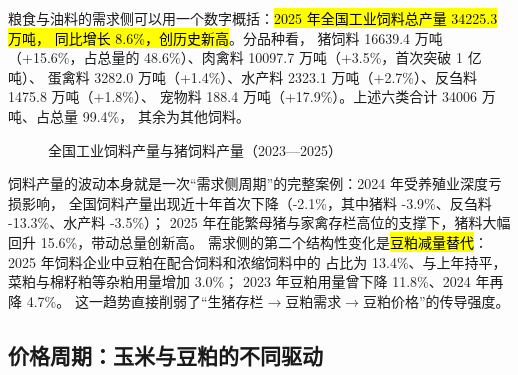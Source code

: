 粮食与油料的需求侧可以用一个数字概括：\hl{2025 年全国工业饲料总产量 34225.3 万吨，
同比增长 8.6\%，创历史新高}\cite{chinafeed2025}。分品种看，
猪饲料 16639.4 万吨（+15.6\%，占总量的 48.6\%）、肉禽料 10097.7 万吨（+3.5\%，首次突破 1 亿吨）、
蛋禽料 3282.0 万吨（+1.4\%）、水产料 2323.1 万吨（+2.7\%）、反刍料 1475.8 万吨（+1.8\%）、
宠物料 188.4 万吨（+17.9\%）\cite{chinafeed2025}。上述六类合计 34006 万吨、占总量 \num{99.4}\%，
其余为其他饲料。

\begin{figure}[htbp]
\centering
{}
\caption{全国工业饲料产量与猪饲料产量（2023---2025）}
\label{fig:feed-output}
\end{figure}

饲料产量的波动本身就是一次“需求侧周期”的完整案例：2024 年受养殖业深度亏损影响，
全国饲料产量出现近十年首次下降（-2.1\%，其中猪料 -3.9\%、反刍料 -13.3\%、水产料 -3.5\%）\cite{chinafeed2024}；
2025 年在能繁母猪与家禽存栏高位的支撑下，猪料大幅回升 15.6\%，带动总量创新高\cite{chinafeed2025}。
需求侧的第二个结构性变化是\hl{豆粕减量替代}：2025 年饲料企业中豆粕在配合饲料和浓缩饲料中的
占比为 13.4\%、与上年持平，菜粕与棉籽粕等杂粕用量增加 3.0\%\cite{chinafeed2025}；
2023 年豆粕用量曾下降 11.8\%、2024 年再降 4.7\%\cite{chinafeed2024}。
这一趋势直接削弱了“生猪存栏$\to$豆粕需求$\to$豆粕价格”的传导强度。

\subsection{价格周期：玉米与豆粕的不同驱动}
\label{sec:grain-cycle}

